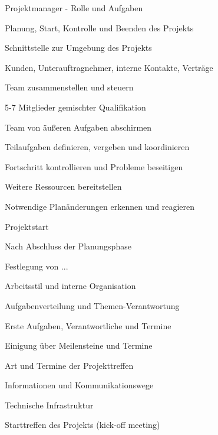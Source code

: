 \documentclass[a4paper]{article}
\begin{document}
\begin{multicols}{3}
  Projektmanager - Rolle und Aufgaben
  \begin{itemize*}
    \item Planung, Start, Kontrolle und Beenden des Projekts
    \item Schnittstelle zur Umgebung des Projekts
    \begin{itemize*}
      \item Kunden, Unterauftragnehmer, interne Kontakte, Verträge
    \end{itemize*}
    \item Team zusammenstellen und steuern
    \begin{itemize*}
      \item 5-7 Mitglieder gemischter Qualifikation
      \item Team von äußeren Aufgaben abschirmen
      \item Teilaufgaben definieren, vergeben und koordinieren
      \item Fortschritt kontrollieren und Probleme beseitigen
    \end{itemize*}
    \item Weitere Ressourcen bereitstellen
    \item Notwendige Planänderungen erkennen und reagieren
  \end{itemize*}

  Projektstart
  \begin{itemize*}
    \item Nach Abschluss der Planungsphase
    \item Festlegung von ...
    \begin{itemize*}
      \item Arbeitsstil und interne Organisation
      \item Aufgabenverteilung und Themen-Verantwortung
      \item Erste Aufgaben, Verantwortliche und Termine
      \item Einigung über Meilensteine und Termine
      \item Art und Termine der Projekttreffen
      \item Informationen und Kommunikationswege
      \item Technische Infrastruktur
    \end{itemize*}
    \item Starttreffen des Projekts (kick-off meeting)
  \end{itemize*}


\end{multicols}
\end{document}
